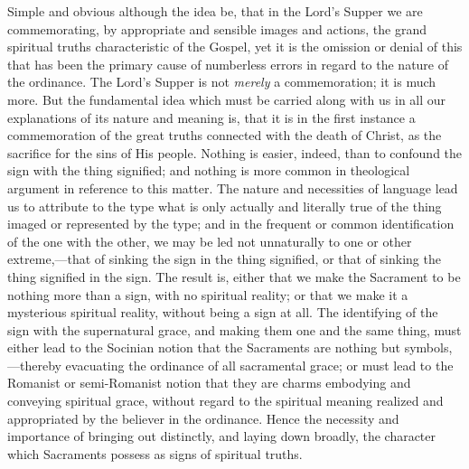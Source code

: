 \documentclass[
  english,
]{book}
\begin{document}
Simple and obvious although the idea be, that in the Lord's Supper we are commemorating, by appropriate and sensible images and actions, the grand spiritual truths characteristic of the Gospel, yet it is the omission or denial of this that has been the primary cause of numberless errors in regard to the nature of the ordinance. The Lord's Supper is not \emph{merely} a commemoration; it is much more. But the fundamental idea which must be carried along with us in all our explanations of its nature and meaning is, that it is in the first instance a commemoration of the great truths connected with the death of Christ, as the sacrifice for the sins of His people. Nothing is easier, indeed, than to confound the sign with the thing signified; and nothing is more common in theological argument in reference to this matter. The nature and necessities of language lead us to attribute to the type what is only actually and literally true of the thing imaged or represented by the type; and in the frequent or common identification of the one with the other, we may be led not unnaturally to one or other extreme,---that of sinking the sign in the thing signified, or that of sinking the thing signified in the sign. The result is, either that we make the Sacrament to be nothing more than a sign, with no spiritual reality; or that we make it a mysterious spiritual reality, without being a sign at all. The identifying of the sign with the supernatural grace, and making them one and the same thing, must either lead to the Socinian notion that the Sacraments are nothing but symbols,---thereby evacuating the ordinance of all sacramental grace; or must lead to the Romanist or semi-Romanist notion that they are charms embodying and conveying spiritual grace, without regard to the spiritual meaning realized and appropriated by the believer in the ordinance. Hence the necessity and importance of bringing out distinctly, and laying down broadly, the character which Sacraments possess as signs of spiritual truths.
\end{document}
